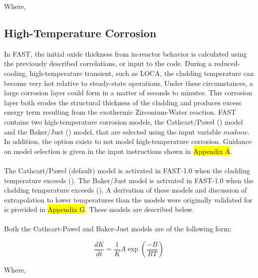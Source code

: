 Where,

\subsection{High-Temperature Corrosion}\label{section:high-temperature-corrosion}

In FAST, the initial oxide thickness from in-reactor behavior is calculated using the previously
described correlations, or input to the code. During a reduced-cooling, high-temperature transient,
such as LOCA, the cladding temperature can become very hot relative to steady-state operations.
Under these circumstances, a large corrosion layer could form in a matter of seconds to minutes.
This corrosion layer both erodes the structural thickness of the cladding and produces excess energy
term resulting from the exothermic Zirconium-Water reaction. FAST contains two high-temperature
corrosion models, the Cathcart/Pawel (\cite{ref:Cathcart1977}) model and the
Baker/Just (\cite{ref:Baker1962}) model, that are selected using the input
variable $modmw$. In addition, the option exists to not model high-temperature corrosion. Guidance
on model selection is given in the input instructions shown in \colorbox{yellow}{Appendix A}.
\\
\\
The Cathcart/Pawel (default) model is activated in FAST-1.0 when the cladding temperature exceeds
 (). The Baker/Just model is activated in FAST-1.0 when the cladding
temperature exceeds  (). A derivation of these models and discussion
of extrapolation to lower temperatures than the models were originally validated for is provided in
\colorbox{yellow}{Appendix G}. These models are described below.
\\
\\
Both the Cathcart-Pawel and Baker-Just models are of the following form:

\begin{equation}
    \label{eq:cp_bj_base_form}
    \frac{dK}{dt} = \frac{1}{K}A\exp\left(\frac{- B}{RT}\right)
\end{equation}

Where,

